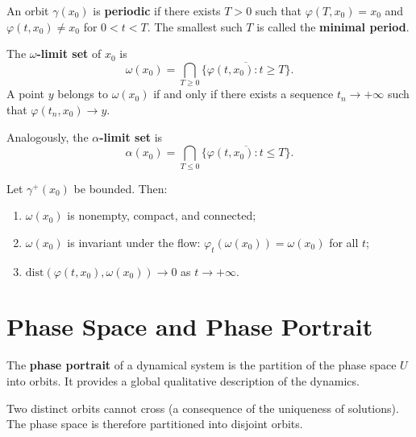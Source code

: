 \begin{definition}
An orbit $\gamma(x_0)$ is \textbf{periodic} if there exists $T > 0$ such that
$\varphi(T, x_0) = x_0$ and $\varphi(t, x_0) \neq x_0$ for $0 < t < T$.
The smallest such $T$ is called the \textbf{minimal period}.
\end{definition}

\begin{definition}
The \textbf{$\omega$-limit set} of $x_0$ is
\[
    \omega(x_0) = \bigcap_{T \geq 0} \overline{\{\varphi(t, x_0) : t \geq T\}}.
\]
A point $y$ belongs to $\omega(x_0)$ if and only if there exists a sequence
$t_n \to +\infty$ such that $\varphi(t_n, x_0) \to y$.
\end{definition}

\begin{definition}
Analogously, the \textbf{$\alpha$-limit set} is
\[
    \alpha(x_0) = \bigcap_{T \leq 0} \overline{\{\varphi(t, x_0) : t \leq T\}}.
\]
\end{definition}

\begin{proposition}
\label{prop:omega-props}
Let $\gamma^+(x_0)$ be bounded. Then:
\begin{enumerate}
    \item $\omega(x_0)$ is nonempty, compact, and connected;
    \item $\omega(x_0)$ is invariant under the flow: $\varphi_t(\omega(x_0)) = \omega(x_0)$ for all $t$;
    \item $\mathrm{dist}(\varphi(t, x_0), \omega(x_0)) \to 0$ as $t \to +\infty$.
\end{enumerate}
\end{proposition}

\section{Phase Space and Phase Portrait}

\begin{definition}
The \textbf{phase portrait} of a dynamical system is the partition of the
phase space $U$ into orbits. It provides a global qualitative description
of the dynamics.
\end{definition}

\begin{remark}
Two distinct orbits cannot cross (a consequence of the uniqueness of
solutions). The phase space is therefore partitioned into disjoint orbits.
\end{remark}

